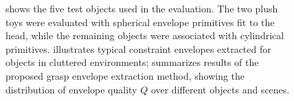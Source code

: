 %
\begin{figure}[t!]
\centering
{}
\caption{ shows the five test objects used in the evaluation. The two plush toys were evaluated with spherical envelope primitives fit to the head, while the remaining objects were associated with cylindrical primitives.  illustrates typical constraint envelopes extracted for objects in cluttered environments;  summarizes results of the proposed grasp envelope extraction method, showing the distribution of envelope quality $Q$ over different objects and scenes. }
\label{fig:results}
\end{figure}
%
